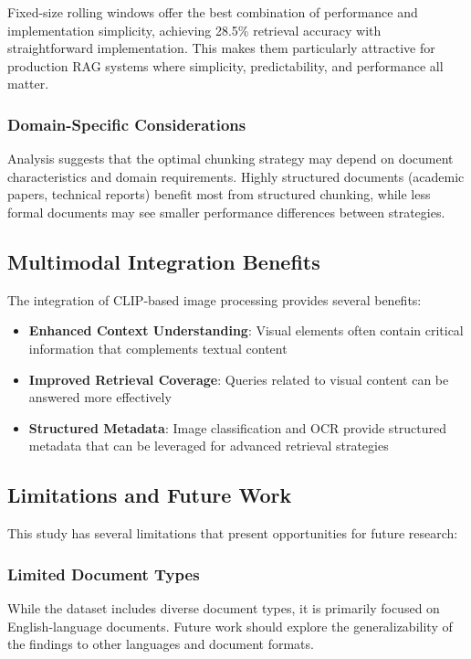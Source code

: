 \documentclass[11pt,a4paper]{article}
\begin{document}
Fixed-size rolling windows offer the best combination of performance and implementation simplicity, achieving 28.5\% retrieval accuracy with straightforward implementation. This makes them particularly attractive for production RAG systems where simplicity, predictability, and performance all matter.

\subsubsection{Domain-Specific Considerations}

Analysis suggests that the optimal chunking strategy may depend on document characteristics and domain requirements. Highly structured documents (academic papers, technical reports) benefit most from structured chunking, while less formal documents may see smaller performance differences between strategies.

\subsection{Multimodal Integration Benefits}

The integration of CLIP-based image processing provides several benefits:

\begin{itemize}
\item \textbf{Enhanced Context Understanding}: Visual elements often contain critical information that complements textual content
\item \textbf{Improved Retrieval Coverage}: Queries related to visual content can be answered more effectively
\item \textbf{Structured Metadata}: Image classification and OCR provide structured metadata that can be leveraged for advanced retrieval strategies
\end{itemize}

\subsection{Limitations and Future Work}

This study has several limitations that present opportunities for future research:

\subsubsection{Limited Document Types}

While the dataset includes diverse document types, it is primarily focused on English-language documents. Future work should explore the generalizability of the findings to other languages and document formats.
\end{document}
